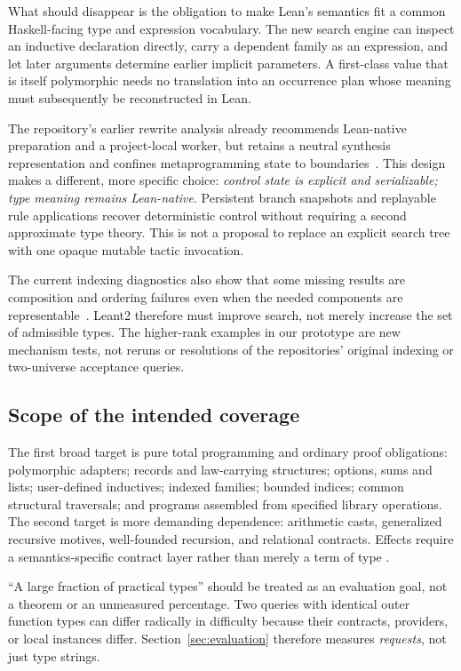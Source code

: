 What should disappear is the obligation to make Lean's semantics fit a common
Haskell-facing type and expression vocabulary. The new search engine can inspect
an inductive declaration directly, carry a dependent family as an expression,
and let later arguments determine earlier implicit parameters. A first-class
value that is itself polymorphic needs no translation into an occurrence plan
whose meaning must subsequently be reconstructed in Lean.

The repository's earlier rewrite analysis already recommends Lean-native
preparation and a project-local worker, but retains a neutral synthesis
representation and confines metaprogramming state to boundaries~\cite{earlier-rewrite}.
This design makes a different, more specific choice: \emph{control state is
explicit and serializable; type meaning remains Lean-native}. Persistent branch
snapshots and replayable rule applications recover deterministic control without
requiring a second approximate type theory. This is not a proposal to replace an
explicit search tree with one opaque mutable tactic invocation.

The current indexing diagnostics also show that some missing results are
composition and ordering failures even when the needed components are
representable~\cite{indexing-diagnostic}. Leant2 therefore must improve search,
not merely increase the set of admissible types. The higher-rank examples in
our prototype are new mechanism tests, not reruns or resolutions of the
repositories' original indexing or two-universe acceptance queries.

\subsection{Scope of the intended coverage}

The first broad target is pure total programming and ordinary proof obligations:
polymorphic adapters; records and law-carrying structures; options, sums and
lists; user-defined inductives; indexed families; bounded indices; common
structural traversals; and programs assembled from specified library operations.
The second target is more demanding dependence: arithmetic casts, generalized
recursive motives, well-founded recursion, and relational contracts. Effects
require a semantics-specific contract layer rather than merely a term of type
.

``A large fraction of practical types'' should be treated as an evaluation goal,
not a theorem or an unmeasured percentage. Two queries with identical outer
function types can differ radically in difficulty because their contracts,
providers, or local instances differ. Section~\ref{sec:evaluation} therefore
measures \emph{requests}, not just type strings.

